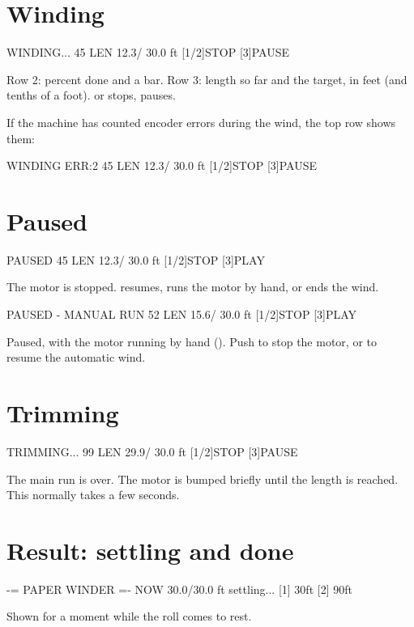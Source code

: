 \section{Winding}\label{sec:screen-winding}
\begin{lcd}
     WINDING...
 45%
LEN   12.3/  30.0 ft
[1/2]STOP   [3]PAUSE
\end{lcd}
Row 2: percent done and a bar. Row 3: length so far and the target, in feet (and tenths of a foot).
 or  stops,  pauses.

If the machine has counted encoder errors during the wind, the top row
shows them:
\begin{lcd}
WINDING    ERR:2
 45%
LEN   12.3/  30.0 ft
[1/2]STOP   [3]PAUSE
\end{lcd}

\section{Paused}
\begin{lcd}
      PAUSED
 45%
LEN   12.3/  30.0 ft
[1/2]STOP   [3]PLAY
\end{lcd}
The motor is stopped.  resumes,  runs the motor by hand,
 or  ends the wind.

\begin{lcd}
PAUSED - MANUAL RUN
 52%
LEN   15.6/  30.0 ft
[1/2]STOP   [3]PLAY
\end{lcd}
Paused, with the motor running by hand (). Push  to stop the
motor, or  to resume the automatic wind.

\section{Trimming}
\begin{lcd}
     TRIMMING...
 99%
LEN   29.9/  30.0 ft
[1/2]STOP   [3]PAUSE
\end{lcd}
The main run is over. The motor is bumped briefly until the length is
reached. This normally takes a few seconds.

\section{Result: settling and done}
\begin{lcd}
 -= PAPER WINDER =-
NOW  30.0/30.0 ft
settling...
[1] 30ft    [2] 90ft
\end{lcd}
Shown for a moment while the roll comes to rest.

